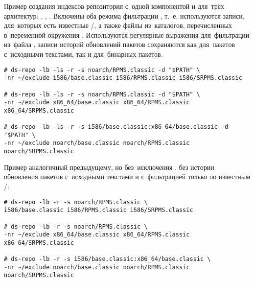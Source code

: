 Пример создания индексов репозитория с~одной компонентой  и для~трёх архитектур: 
, , .
Включены оба режима фильтрации \provides, т.~е.
используются записи, для~которых есть известные \requires/\conflicts, а также файлы из~каталогов, перечисленных в~переменной окружения . 
Используются регулярные выражения для~фильтрации \requires из~файла , 
записи историй обновлений пакетов сохраняются как для~пакетов с~исходными текстами, так и для~бинарных пакетов.

{\large
\begin{verbatim}
# ds-repo -lb -ls -r -s noarch/RPMS.classic -d "$PATH" \
-nr ~/exclude i586/base.classic i586/RPMS.classic i586/SRPMS.classic

# ds-repo -lb -ls -r -s noarch/RPMS.classic -d "$PATH" \
-nr ~/exclude x86_64/base.classic x86_64/RPMS.classic x86_64/SRPMS.classic

# ds-repo -lb -ls -r -s i586/base.classic:x86_64/base.classic -d "$PATH" \
-nr ~/exclude noarch/base.classic noarch/RPMS.classic noarch/SRPMS.classic
\end{verbatim}
}

Пример аналогичный предыдущему, но без~исключения \requires,
без истории обновления пакетов с~исходными текстами и с~фильтрацией \provides только по известным \requires/\conflicts:

{\large
\begin{verbatim}
# ds-repo -lb -r -s noarch/RPMS.classic \
i586/base.classic i586/RPMS.classic i586/SRPMS.classic

# ds-repo -lb -r -s noarch/RPMS.classic \
-nr ~/exclude x86_64/base.classic x86_64/RPMS.classic x86_64/SRPMS.classic

# ds-repo -lb -r -s i586/base.classic:x86_64/base.classic \
-nr ~/exclude noarch/base.classic noarch/RPMS.classic noarch/SRPMS.classic
\end{verbatim}
}
